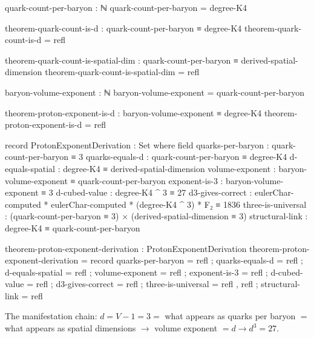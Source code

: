\documentclass[11pt,a4paper]{book}
\begin{document}
\begin{code}
quark-count-per-baryon : ℕ
quark-count-per-baryon = degree-K4

theorem-quark-count-is-d : quark-count-per-baryon ≡ degree-K4
theorem-quark-count-is-d = refl

theorem-quark-count-is-spatial-dim : quark-count-per-baryon ≡ derived-spatial-dimension
theorem-quark-count-is-spatial-dim = refl

baryon-volume-exponent : ℕ
baryon-volume-exponent = quark-count-per-baryon

theorem-proton-exponent-is-d : baryon-volume-exponent ≡ degree-K4
theorem-proton-exponent-is-d = refl

record ProtonExponentDerivation : Set where
  field
    quarks-per-baryon : quark-count-per-baryon ≡ 3
    quarks-equals-d   : quark-count-per-baryon ≡ degree-K4
    d-equals-spatial  : degree-K4 ≡ derived-spatial-dimension
    volume-exponent   : baryon-volume-exponent ≡ quark-count-per-baryon
    exponent-is-3     : baryon-volume-exponent ≡ 3
    d-cubed-value     : degree-K4 ^ 3 ≡ 27
    d3-gives-correct  : eulerChar-computed * eulerChar-computed * (degree-K4 ^ 3) * F₂ ≡ 1836
    three-is-universal : (quark-count-per-baryon ≡ 3) × 
                         (derived-spatial-dimension ≡ 3)
    structural-link   : degree-K4 ≡ quark-count-per-baryon

theorem-proton-exponent-derivation : ProtonExponentDerivation
theorem-proton-exponent-derivation = record
  { quarks-per-baryon = refl
  ; quarks-equals-d   = refl
  ; d-equals-spatial  = refl
  ; volume-exponent   = refl
  ; exponent-is-3     = refl
  ; d-cubed-value     = refl
  ; d3-gives-correct  = refl
  ; three-is-universal = refl , refl
  ; structural-link   = refl
  }
\end{code}

The manifestation chain: $d = V - 1 = 3 = $ what appears as quarks per baryon $= $ what appears as spatial dimensions $\to$ 
volume exponent $= d \to d^3 = 27$.
\end{document}

